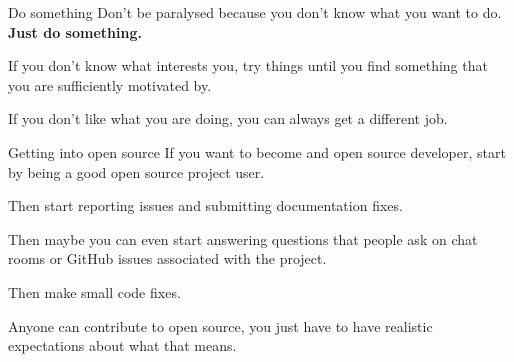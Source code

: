 \documentclass{acm}
\begin{document}
\begin{frame}{Do something}
    Don't be paralysed because you don't know what you want to do. \textbf{Just
    do something.}

    If you don't know what interests you, try things until you find something
    that you are sufficiently motivated by.

    If you don't like what you are doing, you can always get a different job.
\end{frame}

\begin{frame}{Getting into open source}
    If you want to become and open source developer, start by being a good open
    source project user.
    \pause

    Then start reporting issues and submitting documentation fixes.
    \pause

    Then maybe you can even start answering questions that people ask on chat
    rooms or GitHub issues associated with the project.
    \pause

    Then make small code fixes.
    \pause

    Anyone can contribute to open source, you just have to have realistic
    expectations about what that means.
\end{frame}
\end{document}
